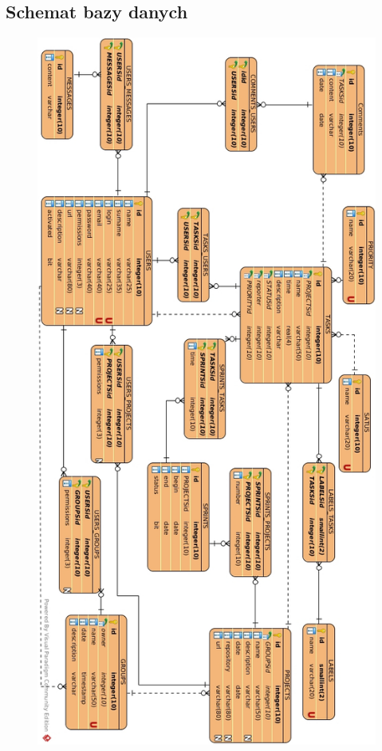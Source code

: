 \documentclass[12pt]{article}
\begin{document}
\subsection{Schemat bazy danych}
\begin{figure}[htp]
\centering
\includegraphics[scale=0.61]{img/db_schema.jpg}
\caption{}
\label{}
\end{figure}
\restoregeometry
\end{document}
